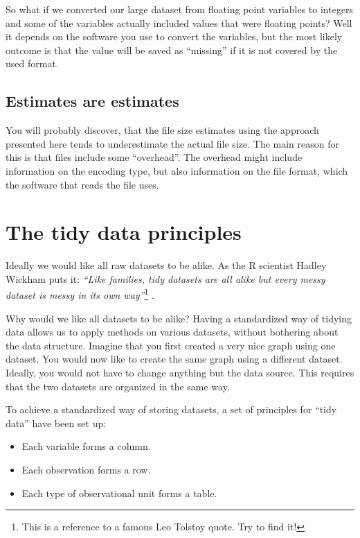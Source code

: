 \documentclass[]{book}
\providecommand{\tightlist}{%
  \setlength{\itemsep}{0pt}\setlength{\parskip}{0pt}}
\let\rmarkdownfootnote\footnote%
\def\footnote{\protect\rmarkdownfootnote}
\begin{document}
So what if we converted our large dataset from floating point variables to integers and some of the variables actually included values that were floating points? Well it depends on the software you use to convert the variables, but the most likely outcome is that the value will be saved as ``missing'' if it is not covered by the used format.

\hypertarget{estimates-are-estimates}{%
\subsection{Estimates are estimates}\label{estimates-are-estimates}}

You will probably discover, that the file size estimates using the approach presented here tends to underestimate the actual file size. The main reason for this is that files include some ``overhead''. The overhead might include information on the encoding type, but also information on the file format, which the software that reads the file uses.

\hypertarget{the-tidy-data-principles}{%
\section{The tidy data principles}\label{the-tidy-data-principles}}

Ideally we would like all raw datasets to be alike. As the R scientist Hadley Wickham puts it: \emph{``Like families, tidy datasets are all alike but every messy dataset is messy in its own way''}\footnote{This is a reference to a famous Leo Tolstoy quote. Try to find it!} \citep{wickham2014tidy}.

Why would we like all datasets to be alike? Having a standardized way of tidying data allows us to apply methods on various datasets, without bothering about the data structure. Imagine that you first created a very nice graph using one dataset. You would now like to create the same graph using a different dataset. Ideally, you would not have to change anything but the data source. This requires that the two datasets are organized in the same way.

To achieve a standardized way of storing datasets, a set of principles for ``tidy data'' have been set up:

\begin{itemize}
\tightlist
\item
  Each variable forms a column.
\item
  Each observation forms a row.
\item
  Each type of observational unit forms a table.
\end{itemize}
\end{document}
